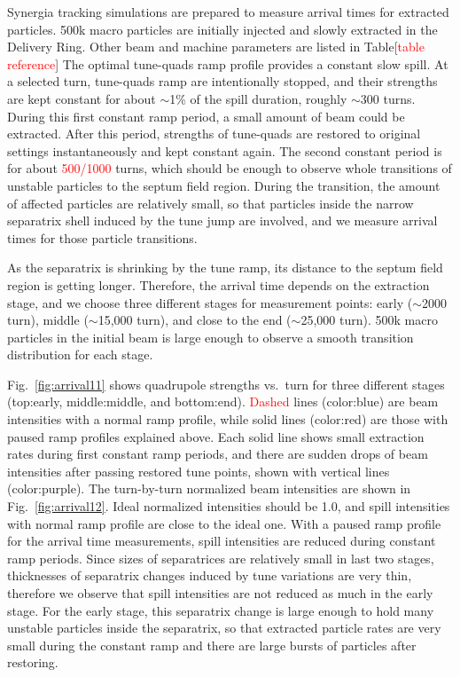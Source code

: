 \documentclass[aps,prstab,onecolumn,preprint,endfloats,11pt]{revtex4-1}
\begin{document}
Synergia tracking simulations are prepared to measure arrival times for extracted particles. 500k macro particles are initially injected and slowly extracted in the Delivery Ring. Other beam and machine parameters are listed in Table[\textcolor{red}{table reference}] The optimal tune-quads ramp profile provides a constant slow spill. At a selected turn, tune-quads ramp are intentionally stopped, and their strengths are kept constant for about $\sim$1\% of the spill duration, roughly $\sim$300 turns. During this first constant ramp period, a small amount of beam could be extracted. After this period, strengths of tune-quads are restored to original settings instantaneously and kept constant again. The second constant period is for about \textcolor{red}{500/1000} turns, which should be enough to observe whole transitions of unstable particles to the septum field region. During the transition, the amount of affected particles are relatively small, so that particles inside the narrow separatrix shell induced by the tune jump are involved, and we measure arrival times for those particle transitions. 

As the separatrix is shrinking by the tune ramp, its distance to the septum field region is getting longer. Therefore, the arrival time depends on the extraction stage, and we choose three different stages for measurement points: early ($\sim$2000 turn), middle ($\sim$15,000 turn), and close to the end ($\sim$25,000 turn). 500k macro particles in the initial beam is large enough to observe a smooth transition distribution for each stage.

Fig.~\ref{fig:arrival11} shows quadrupole strengths vs.~turn for three different stages (top:early, middle:middle, and bottom:end). \textcolor{red}{Dashed} lines (color:blue) are beam intensities with a normal ramp profile, while solid lines (color:red) are those with paused ramp profiles explained above. Each solid line shows small extraction rates during first constant ramp periods, and there are sudden drops of beam intensities after passing restored tune points, shown with vertical lines (color:purple). The turn-by-turn normalized beam intensities are shown in Fig.~\ref{fig:arrival12}. Ideal normalized intensities should be 1.0, and spill intensities with normal ramp profile are close to the ideal one. With a paused ramp profile for the arrival time measurements, spill intensities are reduced during constant ramp periods. Since sizes of separatrices are relatively small in last two stages, thicknesses of separatrix changes induced by tune variations are very thin, therefore we observe that spill intensities are not reduced as much in the early stage. For the early stage, this separatrix change is large enough to hold many unstable particles inside the separatrix, so that extracted particle rates are very small during the constant ramp and there are large bursts of particles after restoring. 
\end{document}
